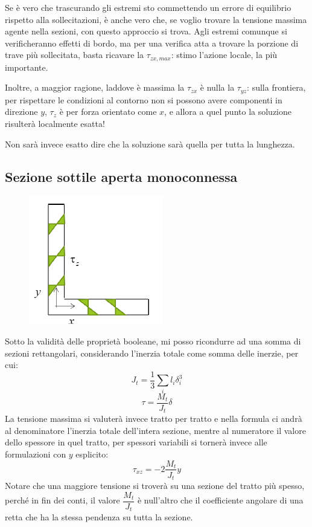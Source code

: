 			Se è vero che trascurando gli estremi sto commettendo un errore di equilibrio rispetto alla sollecitazioni, è anche vero che, se voglio trovare la tensione massima agente nella sezioni, con questo approccio si trova. Agli estremi comunque si verificheranno effetti di bordo, ma per una verifica atta a trovare la porzione di trave più sollecitata, basta ricavare la $\tau_{zx, max}$: stimo l'azione locale, la più importante. \newline 
			
			Inoltre, a maggior ragione, laddove è massima la $\tau_{zx}$ è nulla la $\tau_{yz}$: sulla frontiera, per rispettare le condizioni al contorno non si possono avere componenti in direzione $y$, $\tau_z$ è per forza orientato come $x$, e allora a quel punto la soluzione risulterà localmente esatta!
			
			Non sarà invece esatto dire che la soluzione sarà quella per tutta la lunghezza.  
			
\subsection{Sezione sottile aperta monoconnessa}
\begin{figure}[H]
	\centering
	\includegraphics[width=0.3\linewidth]{immagini_5/screenshot010}
	\label{fig:screenshot010}
\end{figure}

			Sotto la validità delle proprietà booleane, mi posso ricondurre ad una somma di sezioni rettangolari, considerando l'inerzia totale come somma delle inerzie, per cui: 
			\[J_t = \dfrac{1}{3}\sum_il_i\delta^3_i\]
			\[ \tau = \dfrac{M_t}{J_t}\delta\]
			La tensione massima si valuterà invece tratto per tratto e nella formula ci andrà al denominatore l'inerzia totale dell'intera sezione, mentre al numeratore il valore dello spessore in quel tratto, per spessori variabili si tornerà invece alle formulazioni con $y$ esplicito: 
			\[ \tau_{xz} = -2\dfrac{M_t}{J_t}y \]
			Notare che una maggiore tensione si troverà su una sezione del tratto più spesso, perché in fin dei conti, il valore $\dfrac{M_t}{J_t}$ è null'altro che il coefficiente angolare di una retta che ha la stessa pendenza su tutta la sezione. \newline 
			
